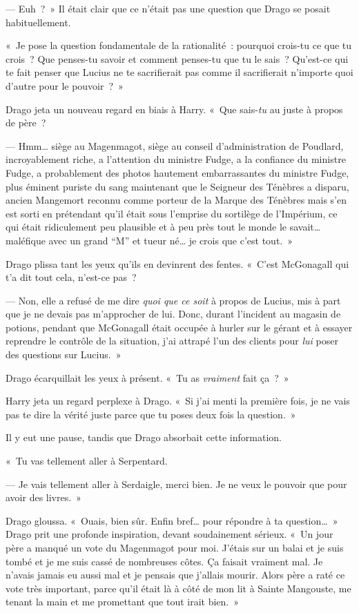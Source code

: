 --- Euh~?~» Il était clair que ce n'était pas une question que Drago se posait habituellement.

«~Je pose la question fondamentale de la rationalité~: pourquoi crois-tu ce que tu crois~?
Que penses-tu savoir et comment penses-tu que tu le sais~?
Qu'est-ce qui te fait penser que Lucius ne te sacrifierait pas comme il sacrifierait n'importe quoi d'autre pour le pouvoir~?~»

Drago jeta un nouveau regard en biais à Harry.  «~Que sais-\emph{tu} au juste à propos de père~?

--- Hmm… siège au Magenmagot, siège au conseil d'administration de Poudlard, incroyablement riche, a l'attention du ministre Fudge, a la confiance du ministre Fudge, a probablement des photos hautement embarrassantes du ministre Fudge, plus éminent puriste du sang maintenant que le Seigneur des Ténèbres a disparu, ancien Mangemort reconnu comme porteur de la Marque des Ténèbres mais s'en est sorti en prétendant qu'il était sous l'emprise du sortilège de l'Impérium, ce qui était ridiculement peu plausible et à peu près tout le monde le savait… maléfique avec un grand “M” et tueur né… je crois que c'est tout.~»

Drago plissa tant les yeux qu'ils en devinrent des fentes.
«~C'est McGonagall qui t'a dit tout cela, n'est-ce pas~?

--- Non, elle a refusé de me dire \emph{quoi que ce soit} à propos de Lucius, mis à part que je ne devais pas m'approcher de lui.
Donc, durant l'incident au magasin de potions, pendant que McGonagall était occupée à hurler sur le gérant et à essayer reprendre le contrôle de la situation, j'ai attrapé l'un des clients pour \emph{lui} poser des questions sur Lucius.~»

Drago écarquillait les yeux à présent. «~Tu as \emph{vraiment} fait ça~?~»

Harry jeta un regard perplexe à Drago. «~Si j'ai menti la première fois, je ne vais pas te dire la vérité juste parce que tu poses deux fois la question.~»

Il y eut une pause, tandis que Drago absorbait cette information.

«~Tu vas tellement aller à Serpentard.

--- Je vais tellement aller à Serdaigle, merci bien. Je ne veux le pouvoir que pour avoir des livres.~»

Drago gloussa. «~Ouais, bien sûr. Enfin bref… pour répondre à ta question…~»
Drago prit une profonde inspiration, devant soudainement sérieux.
«~Un jour père a manqué un vote du Magenmagot pour moi.
J'étais sur un balai et je suis tombé et je me suis cassé de nombreuses côtes.
Ça faisait vraiment mal.
Je n'avais jamais eu aussi mal et je pensais que j'allais mourir.
Alors père a raté ce vote très important, parce qu'il était là à côté de mon lit à Sainte Mangouste, me tenant la main et me promettant que tout irait bien.~»


